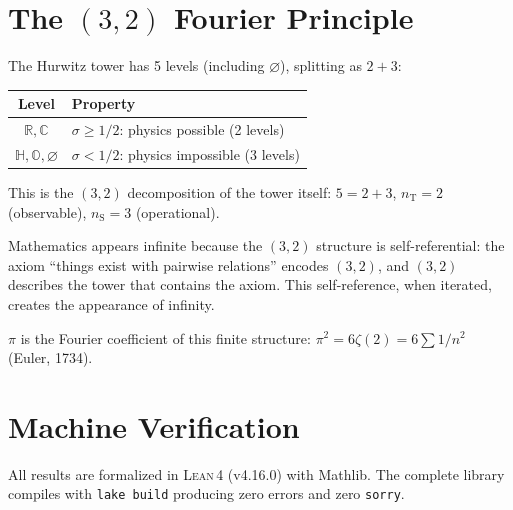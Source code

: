 \documentclass[12pt]{article}
\theoremstyle{remark}
\newcommand{\CC}{\mathbb{C}}
\newcommand{\RR}{\mathbb{R}}
\newcommand{\HH}{\mathbb{H}}
\newcommand{\OO}{\mathbb{O}}
\newcommand{\nS}{n_{\mathrm{S}}}
\newcommand{\nT}{n_{\mathrm{T}}}
\newcommand{\Lean}{\textsc{Lean\,4}}
\begin{document}
\section{The $(3,2)$ Fourier Principle}

The Hurwitz tower has 5 levels (including $\varnothing$),
splitting as $2 + 3$:

\begin{center}
\begin{tabular}{cl}
\toprule
Level & Property \\
\midrule
$\RR, \CC$ & $\sigma \ge 1/2$: physics possible (2 levels) \\
$\HH, \OO, \varnothing$ & $\sigma < 1/2$: physics impossible (3 levels) \\
\bottomrule
\end{tabular}
\end{center}

This is the $(3,2)$ decomposition of the tower itself:
$5 = 2 + 3$, $\nT = 2$ (observable), $\nS = 3$ (operational).

Mathematics appears infinite because the $(3,2)$ structure
is self-referential: the axiom ``things exist with pairwise
relations'' encodes $(3,2)$, and $(3,2)$ describes the tower
that contains the axiom. This self-reference, when iterated,
creates the appearance of infinity.

$\pi$ is the Fourier coefficient of this finite structure:
$\pi^2 = 6\zeta(2) = 6\sum 1/n^2$ (Euler, 1734).

\section{Machine Verification}

All results are formalized in \Lean{} (v4.16.0) with Mathlib.
The complete library compiles with \texttt{lake build}
producing zero errors and zero \texttt{sorry}.
\end{document}
